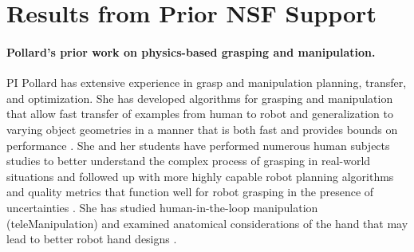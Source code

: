\section{Results from Prior NSF Support}

\paragraph{Pollard's prior work on physics-based grasping and manipulation.} 
PI Pollard has extensive experience in grasp and manipulation planning, transfer, and optimization.   She has developed algorithms for grasping and manipulation that allow fast transfer of examples from human to robot and generalization to varying object geometries in a manner that is both fast and provides bounds on performance \cite{pollard2004closure,Pollard:WAFR02,pollard2005physically,Li:graspDB07}.   She and her students have performed numerous human subjects studies to better understand the complex process of grasping in real-world situations \cite{Chang:2009,Chang:JMB10,illing2014changing,liu2016annotating} and followed up with more highly capable robot planning algorithms and quality metrics that function well for robot grasping in the presence of uncertainties \cite{Chang:ICRA10,Kappler:2012,kim2013physically}.   She has studied human-in-the-loop manipulation (teleManipulation) \cite{Toh:2012,chung2015quadratic,Kim:CGA11} and examined anatomical considerations of the hand that may lead to better robot hand designs \cite{pollard2002tendon,fu2006importance,Chang:twoAxis08,Chang:CoR06,Chang:AoR06}.


